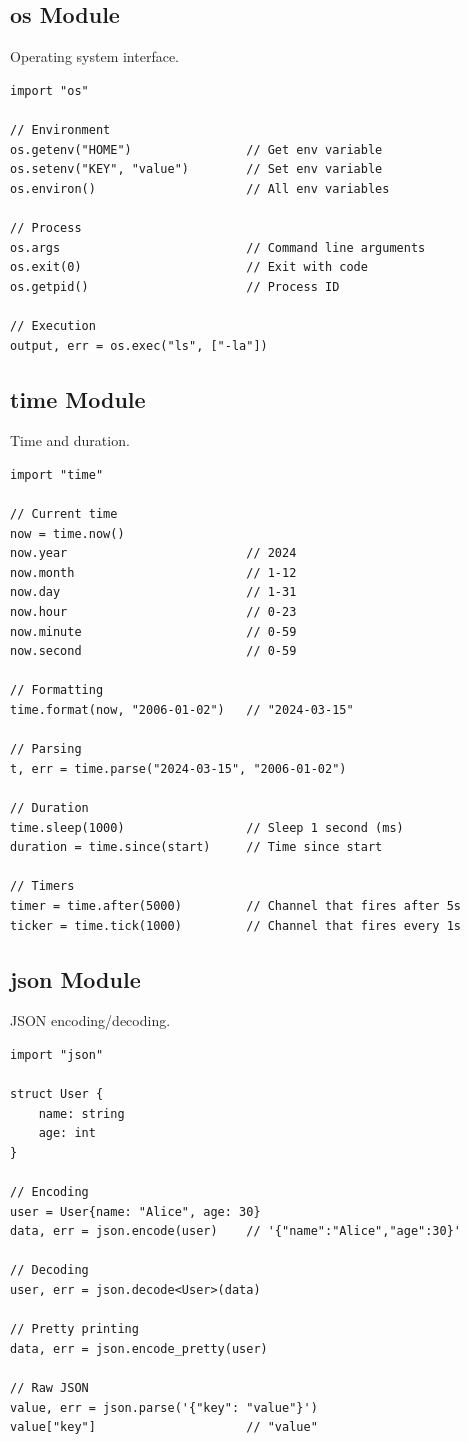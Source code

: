 \subsection{os Module}

Operating system interface.

\begin{lstlisting}
import "os"

// Environment
os.getenv("HOME")                // Get env variable
os.setenv("KEY", "value")        // Set env variable
os.environ()                     // All env variables

// Process
os.args                          // Command line arguments
os.exit(0)                       // Exit with code
os.getpid()                      // Process ID

// Execution
output, err = os.exec("ls", ["-la"])
\end{lstlisting}

\subsection{time Module}

Time and duration.

\begin{lstlisting}
import "time"

// Current time
now = time.now()
now.year                         // 2024
now.month                        // 1-12
now.day                          // 1-31
now.hour                         // 0-23
now.minute                       // 0-59
now.second                       // 0-59

// Formatting
time.format(now, "2006-01-02")   // "2024-03-15"

// Parsing
t, err = time.parse("2024-03-15", "2006-01-02")

// Duration
time.sleep(1000)                 // Sleep 1 second (ms)
duration = time.since(start)     // Time since start

// Timers
timer = time.after(5000)         // Channel that fires after 5s
ticker = time.tick(1000)         // Channel that fires every 1s
\end{lstlisting}

\subsection{json Module}

JSON encoding/decoding.

\begin{lstlisting}
import "json"

struct User {
    name: string
    age: int
}

// Encoding
user = User{name: "Alice", age: 30}
data, err = json.encode(user)    // '{"name":"Alice","age":30}'

// Decoding
user, err = json.decode<User>(data)

// Pretty printing
data, err = json.encode_pretty(user)

// Raw JSON
value, err = json.parse('{"key": "value"}')
value["key"]                     // "value"
\end{lstlisting}

